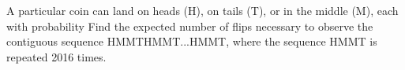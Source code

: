 A particular coin can land on heads (H), on tails (T), or in the middle (M), each with probability  Find the expected number of flips necessary to observe the contiguous sequence HMMTHMMT...HMMT, where the sequence HMMT is repeated 2016 times.